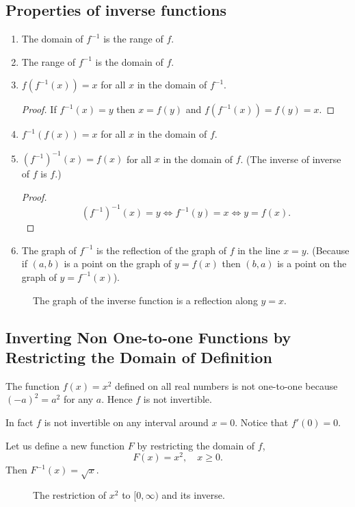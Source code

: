 \documentclass[calc1-main.tex]{subfiles}
\begin{document}
\subsection*{Properties of inverse functions}
\begin{enumerate}
  \item The domain of $f^{-1}$ is the range of $f$.
  \item The range of $f^{-1}$ is the domain of $f$.
  \item $f(f^{-1}(x)) = x$ for all $x$ in the domain of $f^{-1}$.
  \begin{proof}
    If $f^{-1}(x) = y$ then $x = f(y)$ and $f(f^{-1}(x)) = f(y) = x$.
  \end{proof}
  \item $f^{-1}(f(x)) = x$ for all $x$ in the domain of $f$.
  \item $(f^{-1})^{-1}(x) = f(x)$ for all $x$ in the domain of $f$. (The inverse of inverse of $f$ is $f$.)
  \begin{proof}
    \[
      (f^{-1})^{-1}(x) = y \iff f^{-1}(y) = x \iff y = f(x).
    \]
  \end{proof}
  \item The graph of $f^{-1}$ is the reflection of the graph of $f$ in the line $x=y$. (Because if $(a, b)$ is a point on the graph of $y=f(x)$ then $(b, a)$ is a point on the graph of $y = f^{-1}(x)$).
\end{enumerate}
\begin{figure}[H]
  \centering
  
  \caption{The graph of the inverse function is a reflection along $y=x$.}
\end{figure}

\subsection*{Inverting Non One-to-one Functions by Restricting the Domain of Definition}
\begin{minipage}{0.5\textwidth}
  The function $f(x) = x^2$ defined on all real numbers is not one-to-one because $(-a)^2 = a^2$ for any $a$. Hence $f$ is not invertible.

  In fact $f$ is not invertible on any interval around $x=0$. Notice that $f'(0)=0$.

  Let us define a new function $F$ by restricting the domain of $f$,
  \[
    F(x) = x^2, \quad x \geq 0.
  \]
  Then $F^{-1}(x) = \sqrt{x}$.


\end{minipage}%
\begin{minipage}{0.5\textwidth}
  \begin{figure}[H]
    \centering
    
    \caption{The restriction of $x^2$ to $[0, \infty)$ and its inverse.}
  \end{figure}
\end{minipage}
\end{document}
